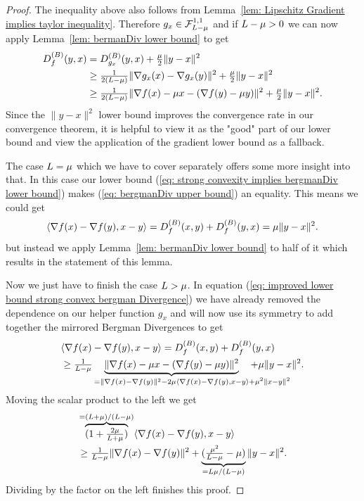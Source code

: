 \begin{proof}
	The inequality above also follows from Lemma~\ref{lem: Lipschitz Gradient
	implies taylor inequality}. Therefore
	\(g_x\in\mathcal{F}^{1,1}_{L-\mu}\) and if \(L -\mu>0\) we
	can now apply Lemma~\ref{lem: bermanDiv lower bound} to get
	\begin{align}
		D^{(B)}_{f}(y,x)
		&= D^{(B)}_{g_x}(y,x) + \tfrac{\mu}2 \|y-x\|^2
		\nonumber \\
		&\ge \tfrac{1}{2(L-\mu)} \|\nabla g_x(x) - \nabla g_x(y)\|^2
		+ \tfrac{\mu}2 \|y-x\|^2 
		\nonumber \\
		\label{eq: improved lower bound strong convex bergman Divergence}
		&\ge \tfrac{1}{2(L-\mu)}
		\|\nabla f(x) - \mu x - (\nabla f(y)-\mu y)\|^2
		+ \tfrac{\mu}2 \|y-x\|^2.
	\end{align}
	Since the \(\|y-x\|^2\) lower bound improves the convergence rate in
	our convergence theorem, it is helpful to view it as the "good" part of
	our lower bound and view the application of the gradient lower bound as
	a fallback.

	The case \(L=\mu\) which we have to cover separately offers some
	more insight into that. In this case our lower bound  (\ref{eq:
	strong convexity implies bergmanDiv lower bound}) makes (\ref{eq: bergmanDiv
	upper bound}) an equality. This means we could get
	\begin{align*}
		\langle \nabla f(x) - \nabla f(y), x-y\rangle
		= D^{(B)}_{f}(x,y) + D^{(B)}_{f}(y,x) = \mu \|y-x\|^2.
	\end{align*}
	but instead we apply Lemma~\ref{lem: bermanDiv lower bound} to half of it
	which results in the statement of this lemma.

	Now we just have to finish the case \(L>\mu\). In equation
	(\ref{eq: improved lower bound strong convex bergman Divergence}) we have
	already removed the dependence on our helper function \(g_x\) and will now
	use its symmetry to add together the mirrored Bergman Divergences to get
	\begin{align*}
		&\langle \nabla f(x) - \nabla f(y), x-y\rangle
		= \bergmanDiv{f}(x,y) + \bergmanDiv{f}(y,x) \\
		&\ge \tfrac{1}{\ubound-\lbound}
		\underbrace{\|\nabla f(x) - \lbound x - (\nabla f(y)-\lbound y)\|^2}_{
			=\|\nabla f(x) - \nabla f(y)\|^2
			- 2\lbound \langle \nabla f(x) - \nabla f(y), x-y\rangle
			\mathrlap{+ \lbound^2 \| x-y\|^2}
		}
		+ \lbound \|y-x\|^2.
	\end{align*}
	Moving the scalar product to the left we get
	\begin{align*}
		&\overbrace{(1+\tfrac{2\mu}{L+\mu})}^{
			=(L+\mu)/(L-\mu)
		}
		\langle \nabla f(x) - \nabla f(y), x-y\rangle \\
		&\ge \tfrac{1}{L-\mu}\|\nabla f(x) - \nabla f(y)\|^2
		+ \underbrace{(\tfrac{\mu^2}{L-\mu}-\mu)}_{
			=L\mu/(L-\mu)
		} \|y-x\|^2.
	\end{align*}
	Dividing by the factor on the left finishes this proof.
 \end{proof}

